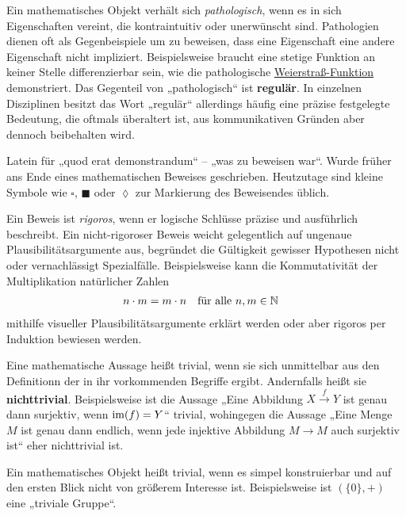 \begin{description}[labelindent=0pt, leftmargin=0pt]
    \item[Pathologisch:] Ein mathematisches Objekt verhält sich \emph{pathologisch}, wenn es in sich Eigenschaften vereint, die kontraintuitiv oder unerwünscht sind. Pathologien dienen oft als Gegenbeispiele um zu beweisen, dass eine Eigenschaft eine andere Eigenschaft nicht impliziert. Beispielsweise braucht eine stetige Funktion an keiner Stelle differenzierbar sein, wie die pathologische \href{https://de.wikipedia.org/wiki/Weierstrass-Funktion}{Weierstraß-Funktion} demonstriert. Das Gegenteil von „pathologisch“ ist \textbf{regulär}. In einzelnen Disziplinen besitzt das Wort „regulär“ allerdings häufig eine präzise festgelegte Bedeutung, die oftmals überaltert ist, aus kommunikativen Gründen aber dennoch beibehalten wird.

    \item[QED:] Latein für „quod erat demonstrandum“ -- „was zu beweisen war“. Wurde früher ans Ende eines mathematischen Beweises geschrieben. Heutzutage sind kleine Symbole wie $\square$, $\blacksquare$ oder $\lozenge$ zur Markierung des Beweisendes üblich.
    
    \item[Rigoros:] Ein Beweis ist \emph{rigoros}, wenn er logische Schlüsse präzise und ausführlich beschreibt. Ein nicht-rigoroser Beweis weicht gelegentlich auf ungenaue Plausibilitätsargumente aus, begründet die Gültigkeit gewisser Hypothesen nicht oder vernachlässigt Spezialfälle. Beispielsweise kann die Kommutativität der Multiplikation natürlicher Zahlen
    \begin{align*}
        n \cdot m & = m \cdot n && \text{für alle}\ n,m\in \mathbb N
    \end{align*}
    mithilfe visueller Plausibilitätsargumente erklärt werden oder aber rigoros per Induktion bewiesen werden.

    \item[Trivial:] Eine mathematische Aussage heißt trivial, wenn sie sich unmittelbar aus den Definitionn der in ihr vorkommenden Begriffe ergibt. Andernfalls heißt sie \textbf{nichttrivial}. Beispielsweise ist die Aussage „Eine Abbildung $X\xrightarrow{f} Y$ ist genau dann surjektiv, wenn $\operatorname{im}(f)=Y$“ trivial, wohingegen die Aussage „Eine Menge $M$ ist genau dann endlich, wenn jede injektive Abbildung $M\to M$ auch surjektiv ist“ eher nichttrivial ist.
    
    Ein mathematisches Objekt heißt trivial, wenn es simpel konstruierbar und auf den ersten Blick nicht von größerem Interesse ist. Beispielsweise ist $(\{0\},+)$ eine „triviale Gruppe“. 


\end{description}
